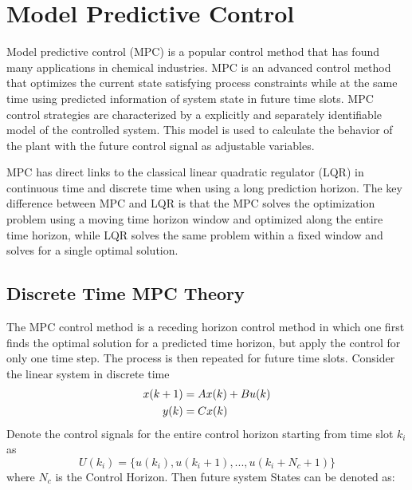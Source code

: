         
    \section{Model Predictive Control}
    
        Model predictive control (MPC) \cite{Wang} is a popular control method that has found many applications in chemical industries. MPC is an advanced control method that optimizes the current state satisfying process constraints while at the same time using predicted information of system state in future time slots.
        MPC control strategies are characterized by a explicitly and separately identifiable model of the controlled system. This model is used to calculate the behavior of the plant with the future control signal as adjustable variables.
        
        MPC has direct links to the classical linear quadratic regulator (LQR) in continuous time and discrete time when using a long prediction horizon. The key difference between MPC and LQR is that the MPC solves the optimization problem using a moving time horizon window and optimized along the entire time horizon, while LQR solves the same problem within a fixed window and solves for a single optimal solution.
    
        \subsection{Discrete Time MPC Theory}

            The MPC control method is a receding horizon control method in which one first finds the optimal solution for a predicted time horizon, but apply the control for only one time step.  The process is then repeated for future time slots.
            Consider the linear system in discrete time
            \begin{equation}
                \label{eq:mpc1}
                \aligned 
                    x(k+1) & = A x(k) + B u(k)\\
                    y(k) & = C x(k)
                \endaligned
            \end{equation}
            Denote the control signals for the entire control horizon starting from time slot $k_i$ as
            \begin{equation}
                \label{eq:Trajectory1}
                U(k_i) = \{u(k_i), u(k_i+1), ... , u(k_i+N_c+1)\}
            \end{equation}
            where $N_c$ is the Control Horizon. Then future system States can be denoted as:
            
